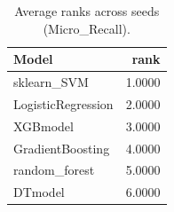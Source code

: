 \begin{table}[t]
\centering
\begin{tabular}{lr}
\toprule
Model & rank \\
\midrule
sklearn_SVM & 1.0000 \\
LogisticRegression & 2.0000 \\
XGBmodel & 3.0000 \\
GradientBoosting & 4.0000 \\
random_forest & 5.0000 \\
DTmodel & 6.0000 \\
\bottomrule
\end{tabular}
\caption{Average ranks across seeds (Micro_Recall).}
\label{tab:avg_rank_Micro_Recall}
\end{table}